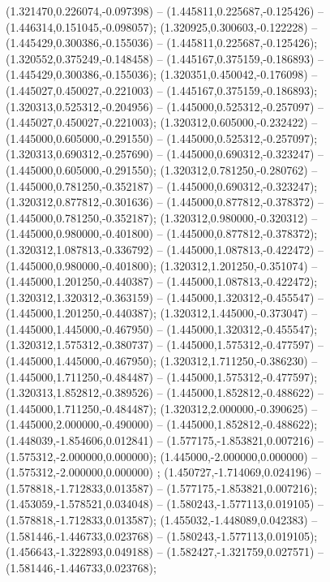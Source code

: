  (1.321470,0.226074,-0.097398) -- (1.445811,0.225687,-0.125426) -- (1.446314,0.151045,-0.098057);
 (1.320925,0.300603,-0.122228) -- (1.445429,0.300386,-0.155036) -- (1.445811,0.225687,-0.125426);
 (1.320552,0.375249,-0.148458) -- (1.445167,0.375159,-0.186893) -- (1.445429,0.300386,-0.155036);
 (1.320351,0.450042,-0.176098) -- (1.445027,0.450027,-0.221003) -- (1.445167,0.375159,-0.186893);
 (1.320313,0.525312,-0.204956) -- (1.445000,0.525312,-0.257097) -- (1.445027,0.450027,-0.221003);
 (1.320312,0.605000,-0.232422) -- (1.445000,0.605000,-0.291550) -- (1.445000,0.525312,-0.257097);
 (1.320313,0.690312,-0.257690) -- (1.445000,0.690312,-0.323247) -- (1.445000,0.605000,-0.291550);
 (1.320312,0.781250,-0.280762) -- (1.445000,0.781250,-0.352187) -- (1.445000,0.690312,-0.323247);
 (1.320312,0.877812,-0.301636) -- (1.445000,0.877812,-0.378372) -- (1.445000,0.781250,-0.352187);
 (1.320312,0.980000,-0.320312) -- (1.445000,0.980000,-0.401800) -- (1.445000,0.877812,-0.378372);
 (1.320312,1.087813,-0.336792) -- (1.445000,1.087813,-0.422472) -- (1.445000,0.980000,-0.401800);
 (1.320312,1.201250,-0.351074) -- (1.445000,1.201250,-0.440387) -- (1.445000,1.087813,-0.422472);
 (1.320312,1.320312,-0.363159) -- (1.445000,1.320312,-0.455547) -- (1.445000,1.201250,-0.440387);
 (1.320312,1.445000,-0.373047) -- (1.445000,1.445000,-0.467950) -- (1.445000,1.320312,-0.455547);
 (1.320312,1.575312,-0.380737) -- (1.445000,1.575312,-0.477597) -- (1.445000,1.445000,-0.467950);
 (1.320312,1.711250,-0.386230) -- (1.445000,1.711250,-0.484487) -- (1.445000,1.575312,-0.477597);
 (1.320313,1.852812,-0.389526) -- (1.445000,1.852812,-0.488622) -- (1.445000,1.711250,-0.484487);
 (1.320312,2.000000,-0.390625) -- (1.445000,2.000000,-0.490000) -- (1.445000,1.852812,-0.488622);
 (1.448039,-1.854606,0.012841) -- (1.577175,-1.853821,0.007216) -- (1.575312,-2.000000,0.000000);
 (1.445000,-2.000000,0.000000) -- (1.575312,-2.000000,0.000000) ;
 (1.450727,-1.714069,0.024196) -- (1.578818,-1.712833,0.013587) -- (1.577175,-1.853821,0.007216);
 (1.453059,-1.578521,0.034048) -- (1.580243,-1.577113,0.019105) -- (1.578818,-1.712833,0.013587);
 (1.455032,-1.448089,0.042383) -- (1.581446,-1.446733,0.023768) -- (1.580243,-1.577113,0.019105);
 (1.456643,-1.322893,0.049188) -- (1.582427,-1.321759,0.027571) -- (1.581446,-1.446733,0.023768);
